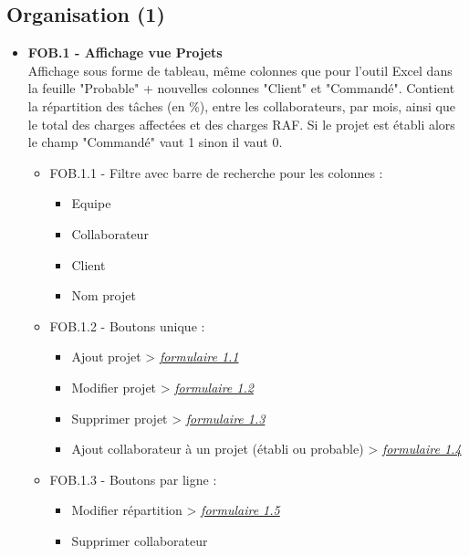 \documentclass[french]{report}
\begin{document}
\subsection{Organisation (1)}

\begin{itemize}[label=\textbullet, font=\normalfont \color{blue}]
  \item{\textbf{FOB.1 - Affichage vue Projets}}\\
Affichage sous forme de tableau, même colonnes que pour l’outil Excel dans la
feuille "Probable" + nouvelles colonnes "Client" et "Commandé". Contient la
répartition des tâches (en \%), entre les collaborateurs, par mois, ainsi que le
total des charges affectées et des charges RAF. Si le projet est établi alors
le champ "Commandé" vaut 1 sinon il vaut 0.

  \begin{itemize}[label=\textbullet]
    \item{FOB.1.1 - Filtre avec barre de recherche pour les colonnes : }

    \begin{itemize}[label=-]
      \item{Equipe}
      \item{Collaborateur}
      \item{Client}
      \item{Nom projet}
    \end{itemize}

    \item{FOB.1.2 - Boutons unique : }

    \begin{itemize}[label=-]
      \item{Ajout projet} > \hyperref[sec:1.1]{\emph{formulaire 1.1}}
      \item{Modifier projet} > \hyperref[sec:1.2]{\emph{formulaire 1.2}}
      \item{Supprimer projet} > \hyperref[sec:1.3]{\emph{formulaire 1.3}}
      \item{Ajout collaborateur à un projet (établi ou probable)} > \hyperref[sec:1.4]{\emph{formulaire 1.4}}
    \end{itemize}

    \item{FOB.1.3 - Boutons par ligne : }

    \begin{itemize}[label=-]
      \item{Modifier répartition} > \hyperref[sec:1.5]{\emph{formulaire 1.5}}
      \item{Supprimer collaborateur}
    \end{itemize}


\end{itemize}
\end{itemize}
\end{document}
